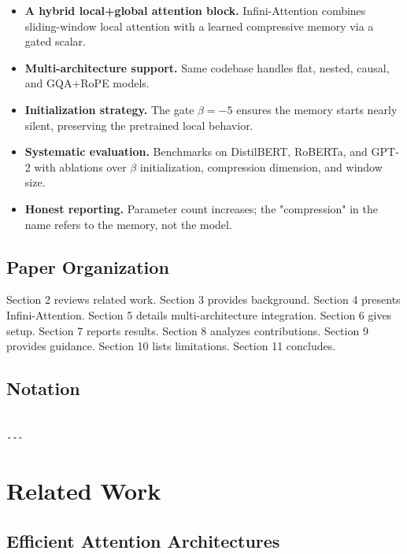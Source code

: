 \begin{itemize}
\item \textbf{A hybrid local+global attention block.} Infini-Attention combines
  sliding-window local attention with a learned compressive memory via a
  gated scalar.
\item \textbf{Multi-architecture support.} Same codebase handles flat, nested,
  causal, and GQA+RoPE models.
\item \textbf{Initialization strategy.} The gate $\beta = -5$ ensures the memory
  starts nearly silent, preserving the pretrained local behavior.
\item \textbf{Systematic evaluation.} Benchmarks on DistilBERT, RoBERTa, and GPT-2
  with ablations over $\beta$ initialization, compression dimension, and
  window size.
\item \textbf{Honest reporting.} Parameter count increases; the "compression" in the
  name refers to the memory, not the model.

\end{itemize}
\subsection{Paper Organization}

Section 2 reviews related work. Section 3 provides background. Section 4 
presents Infini-Attention. Section 5 details multi-architecture integration. 
Section 6 gives setup. Section 7 reports results. Section 8 analyzes 
contributions. Section 9 provides guidance. Section 10 lists limitations. 
Section 11 concludes.



\subsection{Notation}

\begin{lstlisting}

---
\end{lstlisting}


\section{Related Work}

\subsection{Efficient Attention Architectures}

